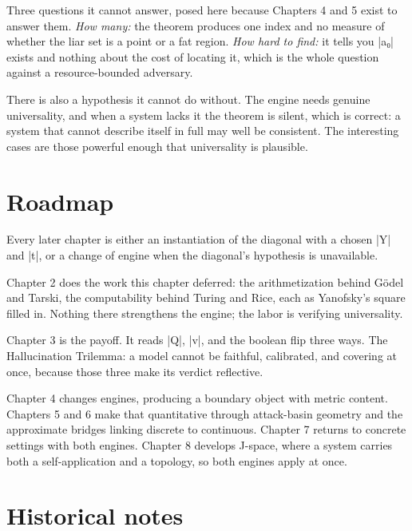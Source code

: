 \documentclass{memoir}
\begin{document}
Three questions it cannot answer, posed here because Chapters 4 and 5 exist to
answer them. \emph{How many:} the theorem produces one index and no measure of
whether the liar set is a point or a fat region. \emph{How hard to find:} it tells
you \LeanVerb|a₀| exists and nothing about the cost of locating it, which is the whole
question against a resource-bounded adversary.

There is also a hypothesis it cannot do without. The engine needs genuine
universality, and when a system lacks it the theorem is silent, which is
correct: a system that cannot describe itself in full may well be consistent.
The interesting cases are those powerful enough that universality is plausible.



\section{Roadmap}\label{Two--Schemas--of--Impossibility-005F-005F-005F--Machine--Checked--Limits--of--Trustworthy--Machine--Learning-005F-005F-005F--and--Why--They--Tighten--with--Capability----The--Diagonal----Roadmap}

Every later chapter is either an instantiation of the diagonal with a chosen \LeanVerb|Y|
and \LeanVerb|t|, or a change of engine when the diagonal's hypothesis is unavailable.

Chapter 2 does the work this chapter deferred: the arithmetization behind Gödel
and Tarski, the computability behind Turing and Rice, each as Yanofsky's square
filled in. Nothing there strengthens the engine; the labor is verifying
universality.

Chapter 3 is the payoff. It reads \LeanVerb|Q|, \LeanVerb|v|, and the boolean flip three ways. The
Hallucination Trilemma: a model cannot be faithful, calibrated, and covering at
once, because those three make its verdict reflective.

Chapter 4 changes engines, producing a boundary object with metric content.
Chapters 5 and 6 make that quantitative through attack-basin geometry and the
approximate bridges linking discrete to continuous. Chapter 7 returns to
concrete settings with both engines. Chapter 8 develops J-space, where a system
carries both a self-application and a topology, so both engines apply at once.



\section{Historical notes}\label{Two--Schemas--of--Impossibility-005F-005F-005F--Machine--Checked--Limits--of--Trustworthy--Machine--Learning-005F-005F-005F--and--Why--They--Tighten--with--Capability----The--Diagonal----Historical--notes}
\end{document}
